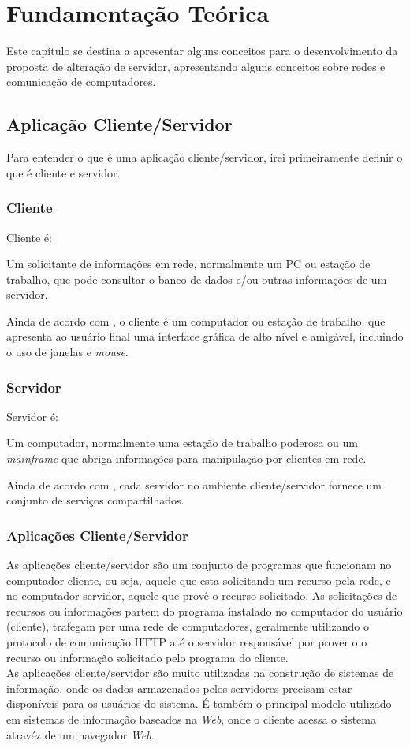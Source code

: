 \chapter{Fundamentação Teórica}\label{fundamentacao-teorica}
Este capítulo se destina a apresentar alguns conceitos para o desenvolvimento da proposta de alteração de servidor, apresentando alguns conceitos sobre redes e comunicação de computadores.

\section{Aplicação Cliente/Servidor}
Para entender o que é uma aplicação cliente/servidor, irei primeiramente definir o que é cliente e servidor.
\subsection{Cliente}
Cliente é:
\begin{citacao}
Um solicitante de informações em rede, normalmente um PC ou estação de trabalho, que pode consultar o banco de dados e/ou outras informações de um servidor. \cite{stallings2005}
\end{citacao}
Ainda de acordo com \cite{stallings2005}, o cliente é um computador ou estação de trabalho, que apresenta ao usuário final uma interface gráfica de alto nível e amigável, incluindo o uso de janelas e \textit{mouse}. 
\subsection{Servidor}
Servidor é:
\begin{citacao}
Um computador, normalmente uma estação de trabalho poderosa ou um \textit{mainframe} que abriga informações para manipulação por clientes em rede. \cite{stallings2005}
\end{citacao}
Ainda de acordo com \cite{stallings2005}, cada servidor no ambiente cliente/servidor fornece um conjunto de serviços compartilhados.
\subsection{Aplicações Cliente/Servidor}
As aplicações cliente/servidor são um conjunto de programas que funcionam no computador cliente, ou seja, aquele que esta solicitando um recurso pela rede, e no computador servidor, aquele que provê o recurso solicitado. As solicitações de recursos ou informações partem do programa instalado no computador do usuário (cliente), trafegam por uma rede de computadores, geralmente utilizando o protocolo de comunicação HTTP até o servidor responsável por prover o o recurso ou informação solicitado pelo programa do cliente.\\
As aplicações cliente/servidor são muito utilizadas na construção de sistemas de informação, onde os dados armazenados pelos servidores precisam estar disponíveis para os usuários do sistema. É também o principal modelo utilizado em sistemas de informação baseados na \textit{Web}, onde o cliente acessa o sistema atravéz de um navegador \textit{Web}.

